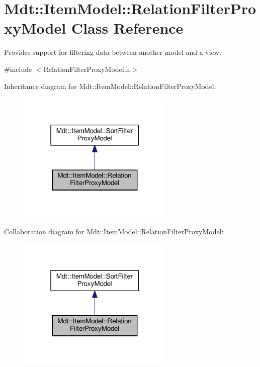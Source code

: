 \hypertarget{class_mdt_1_1_item_model_1_1_relation_filter_proxy_model}{}\section{Mdt\+:\+:Item\+Model\+:\+:Relation\+Filter\+Proxy\+Model Class Reference}
\label{class_mdt_1_1_item_model_1_1_relation_filter_proxy_model}


Provides support for filtering data between another model and a view.  




{\ttfamily \#include $<$Relation\+Filter\+Proxy\+Model.\+h$>$}



Inheritance diagram for Mdt\+:\+:Item\+Model\+:\+:Relation\+Filter\+Proxy\+Model\+:\nopagebreak
\begin{figure}[H]
\begin{center}
\leavevmode
\includegraphics[width=211pt]{class_mdt_1_1_item_model_1_1_relation_filter_proxy_model__inherit__graph}
\end{center}
\end{figure}


Collaboration diagram for Mdt\+:\+:Item\+Model\+:\+:Relation\+Filter\+Proxy\+Model\+:\nopagebreak
\begin{figure}[H]
\begin{center}
\leavevmode
\includegraphics[width=211pt]{class_mdt_1_1_item_model_1_1_relation_filter_proxy_model__coll__graph}
\end{center}
\end{figure}
